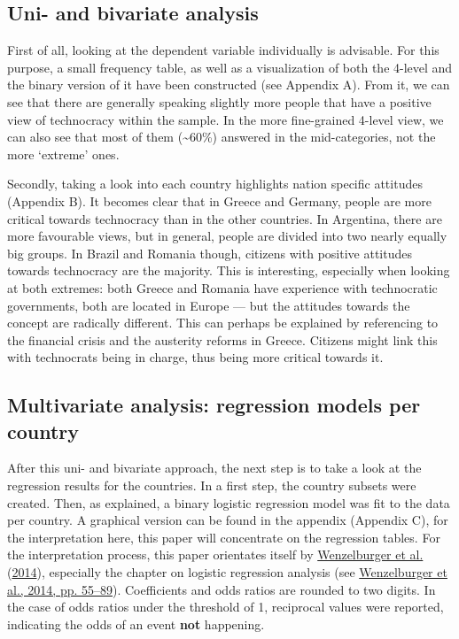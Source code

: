 \documentclass[
  12pt,
  english,
]{article}
\begin{document}
\hypertarget{uni--and-bivariate-analysis}{%
\subsection{Uni- and bivariate
analysis}\label{uni--and-bivariate-analysis}}

First of all, looking at the dependent variable individually is
advisable. For this purpose, a small frequency table, as well as a
visualization of both the 4-level and the binary version of it have been
constructed (see Appendix A). From it, we can see that there are
generally speaking slightly more people that have a positive view of
technocracy within the sample. In the more fine-grained 4-level view, we
can also see that most of them (\textasciitilde60\%) answered in the
mid-categories, not the more `extreme' ones.

Secondly, taking a look into each country highlights nation specific
attitudes (Appendix B). It becomes clear that in Greece and Germany,
people are more critical towards technocracy than in the other
countries. In Argentina, there are more favourable views, but in
general, people are divided into two nearly equally big groups. In
Brazil and Romania though, citizens with positive attitudes towards
technocracy are the majority. This is interesting, especially when
looking at both extremes: both Greece and Romania have experience with
technocratic governments, both are located in Europe --- but the
attitudes towards the concept are radically different. This can perhaps
be explained by referencing to the financial crisis and the austerity
reforms in Greece. Citizens might link this with technocrats being in
charge, thus being more critical towards it.

\newpage{}

\hypertarget{multivariate-analysis-regression-models-per-country}{%
\subsection{Multivariate analysis: regression models per
country}\label{multivariate-analysis-regression-models-per-country}}

After this uni- and bivariate approach, the next step is to take a look
at the regression results for the countries. In a first step, the
country subsets were created. Then, as explained, a binary logistic
regression model was fit to the data per country. A graphical version
can be found in the appendix (Appendix C), for the interpretation here,
this paper will concentrate on the regression tables. For the
interpretation process, this paper orientates itself by
\protect\hyperlink{ref-wenzelburger2014statistische}{Wenzelburger et
al.} (\protect\hyperlink{ref-wenzelburger2014statistische}{2014}),
especially the chapter on logistic regression analysis (see
\protect\hyperlink{ref-wenzelburger2014statistische}{Wenzelburger et
al., 2014, pp. 55--89}). Coefficients and odds ratios are rounded to two
digits. In the case of odds ratios under the threshold of 1, reciprocal
values were reported, indicating the odds of an event \textbf{not}
happening.
\end{document}
